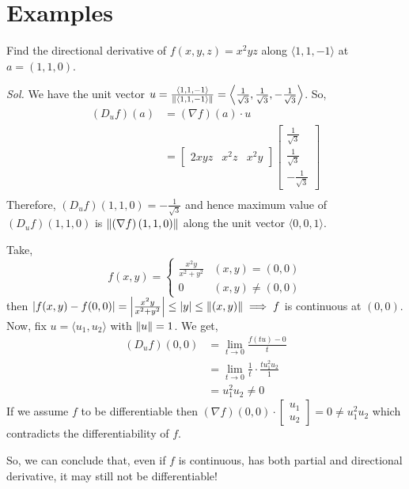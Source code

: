 \documentclass[../Analysis-3]{subfiles}
\begin{document}
\section{Examples}

\begin{Eg}{}{}
  Find the directional derivative of $ f(x,y,z) = x^2yz $ along $ \langle 1,1,-1 \rangle $ at $ a = (1,1,0) $.

  \textit{Sol.} We have the unit vector $ u = \frac{\langle 1,1,-1 \rangle}{\norm{\langle 1,1,-1 \rangle}} = \left\langle \frac{1}{\sqrt{3}}, \frac{1}{\sqrt{3}}, -\frac{1}{\sqrt{3}} \right\rangle $. So,
  \begin{align*}
    \left( D_uf \right)\left( a \right) & = \left( \nabla f\right)\left( a \right)\cdot u                                                   \\
                                        & = \begin{bmatrix} 2xyz & x^2z & x^2y \end{bmatrix}
    \begin{bmatrix} \frac{1}{\sqrt{3}} \\ \frac{1}{\sqrt{3}} \\ -\frac{1}{\sqrt{3}} \end{bmatrix} \\
  \end{align*}
  Therefore, $ \left( D_uf \right)(1,1,0) = -\frac{1}{\sqrt{3}} $ and hence maximum value of $ \left( D_uf \right)(1,1,0) $ is $ \norm{\left( \nabla f\right)(1,1,0)} $ along the unit vector $ \langle 0,0,1 \rangle $.
\end{Eg}

\begin{Eg}{}{}
  Take,
  \[ f(x,y) = \begin{cases}
      \frac{x^2y}{x^2+y^2} & (x,y) = (0,0)     \\
      0                    & (x,y) \not= (0,0)
    \end{cases} \]
  then $ \left| f(x,y) - f(0,0) \right| = \left| \frac{x^2y}{x^2+y^2} \right| \leq |y| \leq \norm{(x,y)} \implies f $ is continuous at $ (0,0) $. Now, fix $ u = \langle u_1, u_2 \rangle $ with $ \norm{u} = 1 $. We get,
  \begin{align*}
    \left( D_uf \right)(0,0) & = \lim_{t\to 0} \frac{f(tu)- 0}{t}                        \\
                             & =\lim_{t\to 0} \frac{1}{t}\cdot\frac{tu_1^2u_2}{1}        \\
                             & = u_1^2u_2 \not= 0 \tag{Because, $ u $ is an unit vector}
  \end{align*}
  If we assume $ f $ to be differentiable then $ \left( \nabla f \right)(0,0) \cdot \begin{bmatrix} u_1 \\ u_2  \end{bmatrix} = 0 \not= u_1^2u_2 $ which contradicts the differentiability of $ f $.
\end{Eg}

So, we can conclude that, even if $ f $ is continuous, has both partial and directional derivative, it may still not be differentiable!
\end{document}
